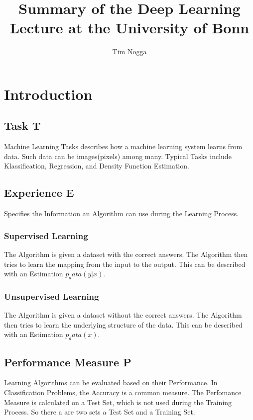 \documentclass[a4paper]{article}
\title{Summary of the Deep Learning Lecture at the University of Bonn}
\author{Tim Nogga}
\begin{document}
\maketitle
\tableofcontents
                                                                                                                                
\section{Introduction}
\subsection{Task T}
Machine Learning Tasks describes how a machine learning system learns from data. Such data can be images(pixels) among many. Typical Tasks include Klassification, Regression, and Density Function Estimation.

\subsection{Experience E}
Specifies the Information an Algorithm can use during the Learning Process.

\subsubsection{Supervised Learning}
The Algorithm is given a dataset with the correct answers. The Algorithm then tries to learn the mapping from the input to the output. This can be described with an Estimation $p_data(y|x)$.

\subsubsection{Unsupervised Learning}
The Algorithm is given a dataset without the correct answers. The Algorithm then tries to learn the underlying structure of the data. This can be described with an Estimation $p_data(x)$.

\subsection{Performance Measure P}
Learning Algorithms can be evaluated based on their Performance. In Classification Problems, the Accuracy is a common measure. %
The Perfomance Measure is calculated on a Test Set, which is not used during the Training Process. So there a are two sets a Test Set and a Training Set. 
\end{document}
